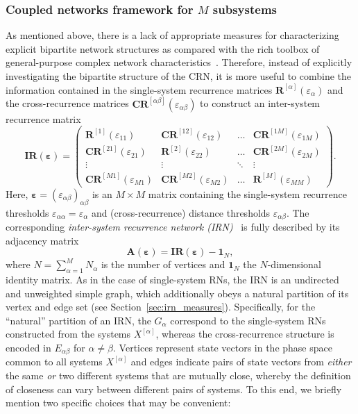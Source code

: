 		\subsubsection{Coupled networks framework for $M$ subsystems}
        		As mentioned above, there is a lack of appropriate measures for characterizing explicit bipartite network structures as compared with the rich toolbox of general-purpose complex network characteristics~\cite{Boccaletti2006,Costa2007}. Therefore, instead of explicitly investigating the bipartite structure of the CRN, it is more useful to combine the information contained in the single-system recurrence matrices $\mathbf{R}^{[\alpha]}(\varepsilon_\alpha)$ and the cross-recurrence matrices $\mathbf{CR}^{[\alpha\beta]}(\varepsilon_{\alpha\beta})$ to construct an inter-system recurrence matrix~\cite{Feldhoff2012}
\begin{equation}
\mathbf{IR}(\mathbf{\varepsilon})=\left( \begin{array}{cccc} \mathbf{R}^{[1]}(\varepsilon_{11}) & \mathbf{CR}^{[12]}(\varepsilon_{12}) & \hdots & \mathbf{CR}^{[1M]}(\varepsilon_{1M}) \\
\mathbf{CR}^{[21]}(\varepsilon_{21}) & \mathbf{R}^{[2]}(\varepsilon_{22}) & \hdots & \mathbf{CR}^{[2M]}(\varepsilon_{2M}) \\
\vdots & \vdots & \ddots & \vdots \\ \mathbf{CR}^{[M1]}(\varepsilon_{M1}) & \mathbf{CR}^{[M2]}(\varepsilon_{M2}) & \hdots & \mathbf{R}^{[M]}(\varepsilon_{MM}) \end{array} \right).
\label{isrm}
\end{equation}
Here, $\mathbf{\varepsilon}=(\varepsilon_{\alpha\beta})_{\alpha\beta}$ is an $M \times M$ matrix containing the single-system recurrence thresholds $\varepsilon_{\alpha\alpha}=\varepsilon_\alpha$ and (cross-recurrence) distance thresholds $\varepsilon_{\alpha\beta}$. The corresponding \emph{inter-system recurrence network (IRN)}~\cite{Feldhoff2012} is fully described by its adjacency matrix
\begin{equation}
\mathbf{A}(\mathbf{\varepsilon})=\mathbf{IR}(\mathbf{\varepsilon}) - \mathbf{1}_N,
\end{equation}
where $N=\sum_{\alpha=1}^M N_\alpha$ is the number of vertices and $\mathbf{1}_N$ the $N$-dimensional identity matrix. As in the case of single-system RNs, the IRN is an undirected and unweighted simple graph, which additionally obeys a natural partition of its vertex and edge set (see Section~\ref{sec:irn_measures}). Specifically, for the ``natural'' partition of an IRN, the $G_\alpha$ correspond to the single-system RNs constructed from the systems $X^{[\alpha]}$, whereas the cross-recurrence structure is encoded in $E_{\alpha\beta}$ for $\alpha \neq \beta$. Vertices represent state vectors in the phase space common to all systems $X^{[\alpha]}$ and edges indicate pairs of state vectors from \emph{either} the same \emph{or} two different systems that are mutually close, whereby the definition of closeness can vary between different pairs of systems. To this end, we briefly mention two specific choices that may be convenient:

